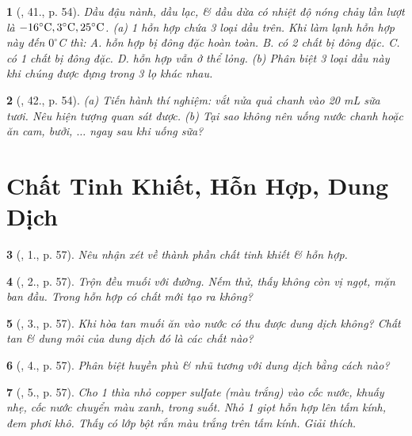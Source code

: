 \documentclass{article}
\newtheorem{baitoan}{}
\begin{document}
\begin{baitoan}[\cite{ncpt_KHTN_6_tap_1}, 41., p. 54]
	Dầu đậu nành, dầu lạc, \& dầu dừa có nhiệt độ nóng chảy lần lượt là $\rm-16^\circ C,3^\circ C,25^\circ C$. (a) 1 hỗn hợp chứa 3 loại dầu trên. Khi làm lạnh hỗn hợp này đến $0^\circ${\rm C} thì: {\sf A.} hỗn hợp bị đông đặc hoàn toàn. {\sf B.} có 2 chất bị đông đặc. {\sf C.} có 1 chất bị đông đặc. {\sf D.} hỗn hợp vẫn ở thể lỏng. (b) Phân biệt 3 loại dầu này khi chúng được đựng trong 3 lọ khác nhau.
\end{baitoan}

\begin{baitoan}[\cite{ncpt_KHTN_6_tap_1}, 42., p. 54]
	(a) Tiến hành thí nghiệm: vắt nửa quả chanh vào {\rm20 mL} sữa tươi. Nêu hiện tượng quan sát được. (b) Tại sao không nên uống nước chanh hoặc ăn cam, bưởi, $\ldots$ ngay sau khi uống sữa?
\end{baitoan}


\section{Chất Tinh Khiết, Hỗn Hợp, Dung Dịch}

\begin{baitoan}[\cite{ncpt_KHTN_6_tap_1}, 1., p. 57]
	Nêu nhận xét về thành phần chất tinh khiết \& hỗn hợp.
\end{baitoan}

\begin{baitoan}[\cite{ncpt_KHTN_6_tap_1}, 2., p. 57]
	Trộn đều muối với đường. Nếm thử, thấy không còn vị ngọt, mặn ban đầu. Trong hỗn hợp có chất mới tạo ra không?
\end{baitoan}

\begin{baitoan}[\cite{ncpt_KHTN_6_tap_1}, 3., p. 57]
	Khi hòa tan muối ăn vào nước có thu được dung dịch không? Chất tan \& dung môi của dung dịch đó là các chất nào?
\end{baitoan}

\begin{baitoan}[\cite{ncpt_KHTN_6_tap_1}, 4., p. 57]
	Phân biệt huyền phù \& nhũ tương với dung dịch bằng cách nào?
\end{baitoan}

\begin{baitoan}[\cite{ncpt_KHTN_6_tap_1}, 5., p. 57]
	Cho 1 thìa nhỏ copper sulfate (màu trắng) vào cốc nước, khuấy nhẹ, cốc nước chuyển màu xanh, trong suốt. Nhỏ 1 giọt hỗn hợp lên tấm kính, đem phơi khô. Thấy có lớp bột rắn màu trắng trên tấm kính. Giải thích.
\end{baitoan}
\end{document}
